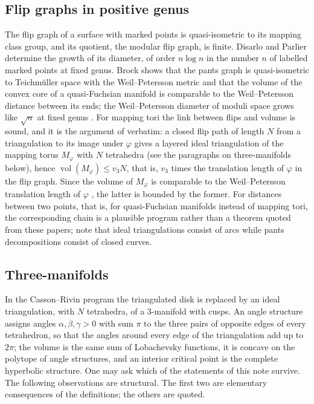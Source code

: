 \documentclass[11pt]{amsart}
\theoremstyle{definition}
\theoremstyle{remark}
\begin{document}
\subsection*{Flip graphs in positive genus}
The flip graph of a surface with marked points is quasi-isometric to its mapping class group, and its quotient, the modular flip graph, is finite. Disarlo and Parlier \cite{DP19} determine the growth of its diameter, of order $n\log n$ in the number $n$ of labelled marked points at fixed genus.
Brock \cite{Bro03} shows that the pants graph is quasi-isometric to Teichm\"uller space with the Weil--Petersson metric and that the volume of the convex core of a quasi-Fuchsian manifold is comparable to the Weil--Petersson distance between its ends; the Weil--Petersson diameter of moduli space grows like $\sqrt n$ at fixed genus \cite{CP12}.
For mapping tori the link between flips and volume is sound, and it is the argument of \cite{STT88} verbatim: a closed flip path of length $N$ from a triangulation to its image under $\varphi$ gives a layered ideal triangulation of the mapping torus $M_\varphi$ with $N$ tetrahedra (see the paragraphs on three-manifolds below), hence
$\operatorname{vol}(M_\varphi)\le v_3N$, that is, $v_3$ times the translation length of $\varphi$ in the flip graph. Since the volume of $M_\varphi$ is comparable to the Weil--Petersson translation length of $\varphi$ \cite{Bro03b}, the latter is bounded by the former.
For distances between two points, that is, for quasi-Fuchsian manifolds instead of mapping tori, the corresponding chain is a plausible program rather than a theorem quoted from these papers; note that ideal triangulations consist of arcs while pants decompositions consist of closed curves.


\subsection*{Three-manifolds}
In the Casson--Rivin program \cite{FG11} the triangulated disk is replaced by an ideal triangulation, with $N$ tetrahedra, of a $3$-manifold with cusps. An angle structure assigns angles $\alpha,\beta,\gamma>0$ with sum $\pi$ to the three pairs of opposite edges of every tetrahedron, so that the angles around every edge of the triangulation add up to $2\pi$;
the volume is the same sum of Lobachevsky functions, it is concave on the polytope of angle structures, and an interior critical point is the complete hyperbolic structure. One may ask which of the statements of this note survive. The following observations are structural. The first two are elementary consequences of the definitions; the others are quoted.
\end{document}
